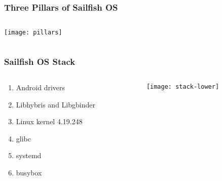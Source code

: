 \documentclass[
	notes=none,
	aspectratio=169
]{beamer}
\begin{document}

\begin{frame}
\frametitle{Three Pillars of Sailfish OS}

\begin{columns}[T]
\begin{column}[T]{1.0\textwidth}

\vspace{0.5cm}
\begin{center}
\texttt{[image: pillars]}
\end{center}

\end{column}
\end{columns}

\end{frame}
\note{
}


\begin{frame}
\frametitle{Sailfish OS Stack}

\begin{columns}[T]
\begin{column}[T]{0.5\textwidth}
\setlength{\parskip}{0.5em}

\vspace{1.5cm}
\begin{enumerate}
\setlength{\parskip}{0.5em}
\item Android drivers
\item Libhybris and Libgbinder
\item Linux kernel 4.19.248
\item glibc
\item systemd
\item busybox
\end{enumerate}

\end{column}
\begin{column}[T]{0.5\textwidth}
\setlength{\parskip}{0.5em}

\vspace{0.0cm}
\texttt{[image: stack-lower]}

\end{column}
\end{columns}

\end{frame}
\note{
}

\end{document}

